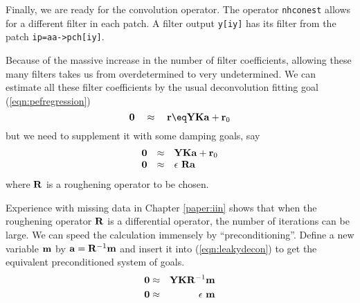 \par
Finally, we are ready for the convolution operator.
The operator \texttt{nhconest} 
allows for a different filter in each patch.
A filter output \texttt{y[iy]}
has its filter from the patch \texttt{ip=aa->pch[iy]}.
\begin{comment}
The line
\texttt{t=a(ip,:)}
extracts the filter for the \texttt{ip}th patch.
If you are confused (as I am) about the difference
between \texttt{aa} and \texttt{a},
maybe now is the time to have a look at beyond Loptran
to the Fortran version.\footnote{
	http://sepwww.stanford.edu/sep/prof/gee/Lib/
	}
\end{comment}
\par
Because of the massive increase in the number of filter coefficients,
allowing these many filters
takes us from overdetermined to very undetermined.
We can estimate all these filter coefficients
by the usual deconvolution fitting goal (\ref{eqn:pefregression})
\begin{equation}
\bold 0 \quad\approx\quad
\bold r \eq \bold Y \bold K \bold a +\bold r_0
\end{equation}
but we need to supplement it with some damping goals, say
\begin{equation}\begin{array}{lll}
\bold 0  &\approx&      \bold Y  \bold K \bold a  +\bold r_0
\\
\bold 0  &\approx&      \epsilon\ \bold R \bold a 
\label{eqn:leakydecon}
\end{array}
\end{equation}
where $\bold R$ is a roughening operator to be chosen.

\par
Experience with missing data in Chapter \ref{paper:iin}
shows that when the roughening operator $\bold R$ is a differential operator,
the number of iterations can be large.
We can speed the calculation immensely by ``preconditioning''.
Define a new variable $\bold m$ by
$\bold a=\bold R^{-1}\bold m$
and insert it into (\ref{eqn:leakydecon}) to get
the equivalent preconditioned system of goals.
\begin{eqnarray}
\label{eqn:goodleak}
\bold 0   &\approx &   \bold Y  \bold K \bold R^{-1}\bold m  \\
\bold 0   &\approx &   \epsilon \ \bold m
\label{eqn:dumbdamp}
\end{eqnarray}

